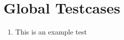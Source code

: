 \chapter{Global Testcases}
\label{ch:tests}

\newcommand{\testfor}[1]{\addtocounter{counterTC}{10}\item[TC\arabic{counterTC}\label{TC\arabic{counterTC}}\\\begin{footnotesize}\textit{(tests \specref{#1})}\end{footnotesize}]}
\newenvironment{tests}{\begin{enumerate}[font = \normalfont, style = multiline, labelindent = 0em, labelwidth = 5em, labelsep* = 1em, leftmargin = !]}{\end{enumerate}}

\begin{tests}
\testfor{FS100}{This is an example test}
\end{tests}